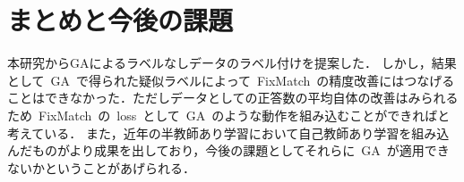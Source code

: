 \documentclass[twocolumn]{jarticle}     %
\begin{document}
\section{まとめと今後の課題}
 本研究からGAによるラベルなしデータのラベル付けを提案した．
 しかし，結果として\ GA\ で得られた疑似ラベルによって\ FixMatch\ の精度改善にはつなげることはできなかった．ただしデータとしての正答数の平均自体の改善はみられるため\ FixMatch\ の\ loss\ として\ GA\ のような動作を組み込むことができればと考えている．
 また，近年の半教師あり学習において自己教師あり学習を組み込んだもの\cite{chen2020simple,wang2019enaet}がより成果を出しており，今後の課題としてそれらに\ GA\ が適用できないかということがあげられる．



\end{document}
